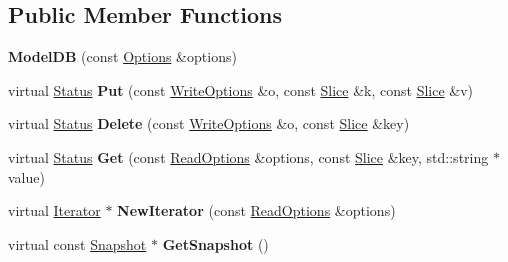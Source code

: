 \subsection*{Public Member Functions}
\begin{DoxyCompactItemize}
\item 
\mbox{\label{classleveldb_1_1_model_d_b_ac0117ce964631ff7977b465de053a282}} 
{\bfseries Model\+DB} (const \mbox{\hyperlink{structleveldb_1_1_options}{Options}} \&options)
\item 
\mbox{\label{classleveldb_1_1_model_d_b_a83d0ace11c8ff079f4e6eaa905744253}} 
virtual \mbox{\hyperlink{classleveldb_1_1_status}{Status}} {\bfseries Put} (const \mbox{\hyperlink{structleveldb_1_1_write_options}{Write\+Options}} \&o, const \mbox{\hyperlink{classleveldb_1_1_slice}{Slice}} \&k, const \mbox{\hyperlink{classleveldb_1_1_slice}{Slice}} \&v)
\item 
\mbox{\label{classleveldb_1_1_model_d_b_a2c2690e07a206fd2197f592dd4478ff6}} 
virtual \mbox{\hyperlink{classleveldb_1_1_status}{Status}} {\bfseries Delete} (const \mbox{\hyperlink{structleveldb_1_1_write_options}{Write\+Options}} \&o, const \mbox{\hyperlink{classleveldb_1_1_slice}{Slice}} \&key)
\item 
\mbox{\label{classleveldb_1_1_model_d_b_ab7744a74b5c0d2cd812dd87e83ca561b}} 
virtual \mbox{\hyperlink{classleveldb_1_1_status}{Status}} {\bfseries Get} (const \mbox{\hyperlink{structleveldb_1_1_read_options}{Read\+Options}} \&options, const \mbox{\hyperlink{classleveldb_1_1_slice}{Slice}} \&key, std\+::string $\ast$value)
\item 
\mbox{\label{classleveldb_1_1_model_d_b_a5acf23bae313f2e2f3ea9f0ab95450cf}} 
virtual \mbox{\hyperlink{classleveldb_1_1_iterator}{Iterator}} $\ast$ {\bfseries New\+Iterator} (const \mbox{\hyperlink{structleveldb_1_1_read_options}{Read\+Options}} \&options)
\item 
\mbox{\label{classleveldb_1_1_model_d_b_aa82849af6a149d122e65a4aac412903f}} 
virtual const \mbox{\hyperlink{classleveldb_1_1_snapshot}{Snapshot}} $\ast$ {\bfseries Get\+Snapshot} ()
\item 

\end{DoxyCompactItemize}
